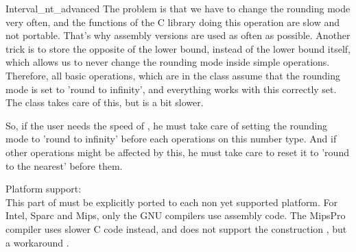 \begin{ccAdvanced}
\begin{ccClass} {Interval_nt_advanced}
The problem is that we have to change the rounding mode very often, and the
functions of the C library doing this operation are slow and not portable.
That's why assembly versions are used as often as possible.
Another trick is to store the opposite of the lower bound, instead of the
lower bound itself, which allows us to never change the rounding mode inside
simple operations.  Therefore, all basic operations, which are in the class 
 assume that the rounding mode is set to 
'round to infinity', and everything works with this correctly set.  
The class  takes care of this, but is a bit slower.

So, if the user needs the speed of , he must
take care of setting the rounding mode to 'round to infinity' before each
operations on this number type.  And if other operations might be affected by
this, he must take care to reset it to 'round to the nearest' before them.


Platform support:\\
This part of {\cgal} must be explicitly ported to each non yet supported
platform.  For Intel, Sparc and Mips, only the GNU compilers use assembly
code.  The MipsPro compiler uses slower C code instead, and does not
support the construction , but a workaround
.

\end{ccClass}

\end{ccAdvanced}


